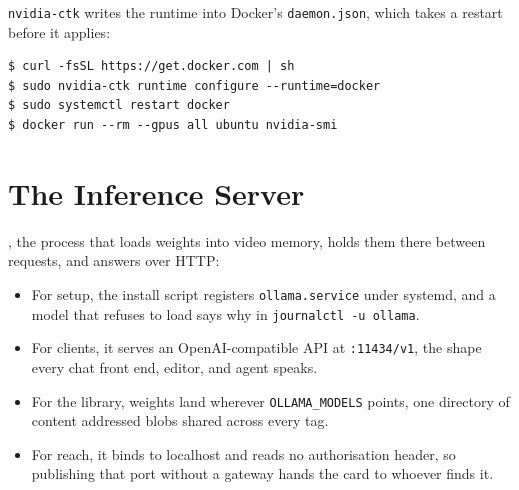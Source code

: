 
 \texttt{nvidia-ctk} writes the runtime into
Docker's \texttt{daemon.json}, which takes a restart before it
applies\cite{dockerEngineInstall}:

\begin{verbatim}
$ curl -fsSL https://get.docker.com | sh
$ sudo nvidia-ctk runtime configure --runtime=docker
$ sudo systemctl restart docker
$ docker run --rm --gpus all ubuntu nvidia-smi
\end{verbatim}


\clearpage
\section{The Inference Server}

, the process that loads weights into
video memory, holds them there between requests, and answers over
HTTP\cite{ollamaDocs}:

\begin{itemize}[topsep=0.25em, itemsep=0.4em, parsep=0em]
    \item For setup, the install script registers \texttt{ollama.service} under
    systemd, and a model that refuses to load says why in
    \texttt{journalctl -u ollama}.
    \item For clients, it serves an OpenAI-compatible API at
    \texttt{:11434/v1}, the shape every chat front end, editor, and agent speaks.
    \item For the library, weights land wherever \texttt{OLLAMA\_MODELS}
    points, one directory of content addressed blobs shared across every tag.
    \item For reach, it binds to localhost and reads no authorisation header, so
    publishing that port without a gateway hands the card to whoever finds it.
\end{itemize}

